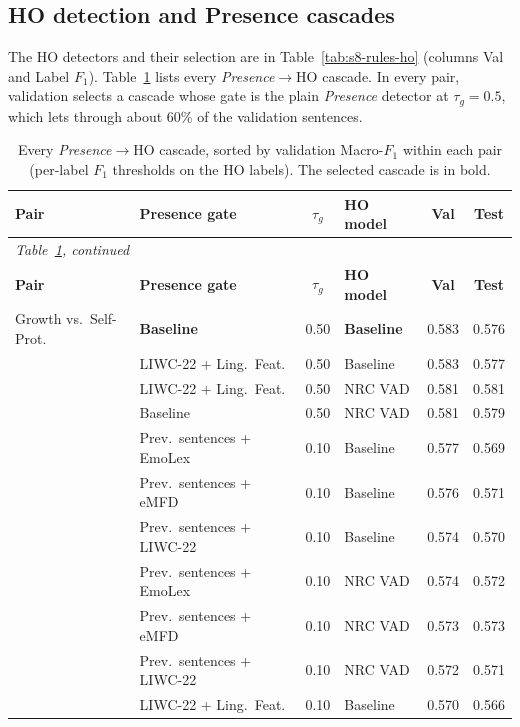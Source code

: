 \subsection{HO detection and Presence cascades}
\label{sec:s8-presence}

The HO detectors and their selection are in Table~\ref{tab:s8-rules-ho} (columns Val and Label $F_1$). Table~\ref{tab:s8-cascades} lists every \emph{Presence}$\rightarrow$HO cascade. In every pair, validation selects a cascade whose gate is the plain \emph{Presence} detector at $\tau_g=0.5$, which lets through about 60\% of the validation sentences.

{\footnotesize
\begin{longtable}{llclcc}
\caption{Every \emph{Presence}$\rightarrow$HO cascade, sorted by validation Macro-$F_1$ within each pair (per-label $F_1$ thresholds on the HO labels). The selected cascade is in bold.}\label{tab:s8-cascades}\\
\hline
\textbf{Pair} & \textbf{Presence gate} & \textbf{$\tau_g$} & \textbf{HO model} & \textbf{Val} & \textbf{Test} \\
\hline
\endfirsthead
\multicolumn{6}{l}{\emph{Table~\ref{tab:s8-cascades}, continued}}\\
\hline
\textbf{Pair} & \textbf{Presence gate} & \textbf{$\tau_g$} & \textbf{HO model} & \textbf{Val} & \textbf{Test} \\
\hline
\endhead
\hline
\endfoot
Growth vs.\ Self-Prot. & \textbf{Baseline} & 0.50 & \textbf{Baseline} & 0.583 & 0.576 \\
 & LIWC-22 + Ling.\ Feat. & 0.50 & Baseline & 0.583 & 0.577 \\
 & LIWC-22 + Ling.\ Feat. & 0.50 & NRC VAD & 0.581 & 0.581 \\
 & Baseline & 0.50 & NRC VAD & 0.581 & 0.579 \\
 & Prev.\ sentences + EmoLex & 0.10 & Baseline & 0.577 & 0.569 \\
 & Prev.\ sentences + eMFD & 0.10 & Baseline & 0.576 & 0.571 \\
 & Prev.\ sentences + LIWC-22 & 0.10 & Baseline & 0.574 & 0.570 \\
 & Prev.\ sentences + EmoLex & 0.10 & NRC VAD & 0.574 & 0.572 \\
 & Prev.\ sentences + eMFD & 0.10 & NRC VAD & 0.573 & 0.573 \\
 & Prev.\ sentences + LIWC-22 & 0.10 & NRC VAD & 0.572 & 0.571 \\
 & LIWC-22 + Ling.\ Feat. & 0.10 & Baseline & 0.570 & 0.566 \\

\end{longtable}}
